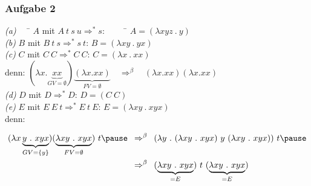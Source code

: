 \documentclass{beamer}
\begin{document}
\begin{frame} \frametitle{Aufgabe 2}
	\begin{tabbing}
		\emph{(a)} $\quad$ \= $A$ mit $A \ t \ s \ u \Rightarrow^\ast s$:
		\pause $\qquad$ \= $A = (\lambda xyz \ . \ y)$ \\[6pt]
		\pause
		\emph{(b)} \> $B$ mit $B \ t \ s \Rightarrow^\ast s \ t$: 
		\pause \> $B = (\lambda xy \ . \ yx)$ \\[6pt]
		\pause
		\emph{(c)} \> $C$ mit $C \ C \Rightarrow^\ast C \ C$: 
		\pause \> $C =( \lambda x \ . \ xx)$  \\
		\pause \> denn: 
		$(\lambda x . \underbrace{xx}_{GV=\emptyset}) \underbrace{(\lambda x.xx)}_{FV = \emptyset} \quad \Rightarrow^{\beta} \quad (\lambda x . xx) (\lambda x.xx)$ \\[6pt]
		\pause
		\emph{(d)} \> $D$ mit $D \Rightarrow^\ast D$: 
		\pause \> $D = (C \ C)$ \\[6pt]
		\pause	
		\emph{(e)} \> $E$ mit $E \ E \ t \Rightarrow^\ast E \ t \ E$: 
		\pause \> $E = (\lambda xy \ . \ xyx)$ \\ \pause
		\> denn:
	\end{tabbing}
	\small
	\begin{align*}
		(\lambda x\underbrace{y \ . \ xyx}_{GV = \{y\}}) (\underbrace{\lambda xy \ . \ xyx}_{FV = \emptyset}) \ t 
		\pause \enskip &\Rightarrow^{\beta} \enskip
		(\lambda y \ . \ (\lambda xy \ . \ xyx) \ y \ (\lambda xy \ . \ xyx)) \ t 
		\pause \\
		&\Rightarrow^{\beta} \enskip 
		(\underbrace{\lambda xy \ . \ xyx}_{ = E}) \ t \ (\underbrace{\lambda xy \ . \ xyx}_{=E})
	\end{align*}
\end{frame}
\end{document}
